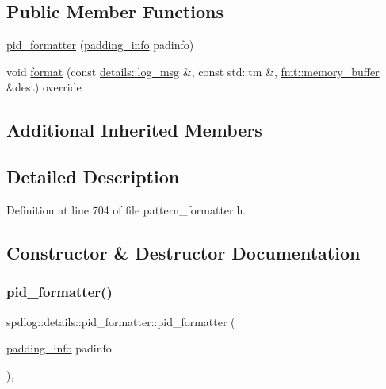\subsection*{Public Member Functions}
\begin{DoxyCompactItemize}
\item 
\hyperlink{classspdlog_1_1details_1_1pid__formatter_a7a37fa9f0f96483f5552cc55ba4c16da}{pid\+\_\+formatter} (\hyperlink{structspdlog_1_1details_1_1padding__info}{padding\+\_\+info} padinfo)
\item 
void \hyperlink{classspdlog_1_1details_1_1pid__formatter_abe690b2f66b9046e40931bae634779d5}{format} (const \hyperlink{structspdlog_1_1details_1_1log__msg}{details\+::log\+\_\+msg} \&, const std\+::tm \&, \hyperlink{format_8h_a21cbf729f69302f578e6db21c5e9e0d2}{fmt\+::memory\+\_\+buffer} \&dest) override
\end{DoxyCompactItemize}
\subsection*{Additional Inherited Members}


\subsection{Detailed Description}


Definition at line 704 of file pattern\+\_\+formatter.\+h.



\subsection{Constructor \& Destructor Documentation}
\mbox{\label{classspdlog_1_1details_1_1pid__formatter_a7a37fa9f0f96483f5552cc55ba4c16da}} 
\subsubsection{\texorpdfstring{pid\+\_\+formatter()}{pid\_formatter()}}
{\footnotesize\ttfamily spdlog\+::details\+::pid\+\_\+formatter\+::pid\+\_\+formatter (\begin{DoxyParamCaption}\item[{\hyperlink{structspdlog_1_1details_1_1padding__info}{padding\+\_\+info}}]{padinfo }\end{DoxyParamCaption})\hspace{0.3cm}{\ttfamily [inline]}, {\ttfamily [explicit]}}



